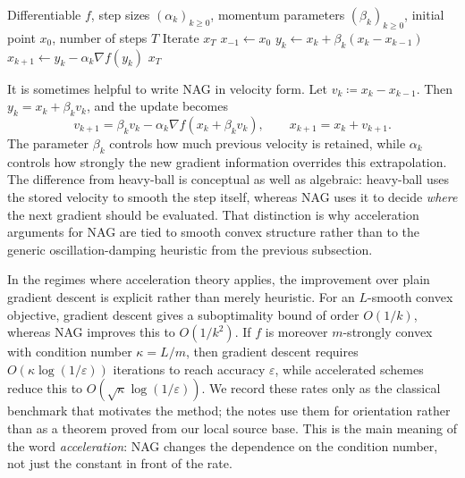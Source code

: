 \begin{algorithm}
  \caption{Nesterov accelerated gradient (NAG)}
  \label{alg:nag}
  \begin{algorithmic}[1]
    \Require Differentiable $f$, step sizes $(\alpha_k)_{k\ge 0}$, momentum parameters $(\beta_k)_{k\ge 0}$, initial point $x_0$, number of steps $T$
    \Ensure Iterate $x_T$
    \State $x_{-1} \gets x_0$
      \State $y_k \gets x_k + \beta_k(x_k-x_{k-1})$ 
      \State $x_{k+1} \gets y_k - \alpha_k \nabla f(y_k)$
    \EndFor
    \State \Return $x_T$
  \end{algorithmic}
\end{algorithm}

It is sometimes helpful to write NAG in velocity form.
Let $v_k \coloneqq x_k-x_{k-1}$.
Then $y_k = x_k + \beta_k v_k$, and the update becomes
\begin{equation}
  v_{k+1} = \beta_k v_k - \alpha_k \nabla f(x_k+\beta_k v_k),
  \qquad
  x_{k+1} = x_k + v_{k+1}.
  \label{eq:nag-velocity}
\end{equation}
The parameter $\beta_k$ controls how much previous velocity is retained, while $\alpha_k$ controls how strongly the new gradient information overrides this extrapolation.
The difference from heavy-ball is conceptual as well as algebraic:
heavy-ball uses the stored velocity to smooth the step itself, whereas NAG uses it to decide \emph{where} the next gradient should be evaluated.
That distinction is why acceleration arguments for NAG are tied to smooth convex structure rather than to the generic oscillation-damping heuristic from the previous subsection.

In the regimes where acceleration theory applies, the improvement over plain gradient descent is explicit rather than merely heuristic.
For an $L$-smooth convex objective, gradient descent gives a suboptimality bound of order $O(1/k)$, whereas NAG improves this to $O(1/k^2)$.
If $f$ is moreover $m$-strongly convex with condition number $\kappa=L/m$, then gradient descent requires $O(\kappa\log(1/\varepsilon))$ iterations to reach accuracy $\varepsilon$, while accelerated schemes reduce this to $O(\sqrt{\kappa}\log(1/\varepsilon))$.
We record these rates only as the classical benchmark that motivates the method; the notes use them for orientation rather than as a theorem proved from our local source base.
This is the main meaning of the word \emph{acceleration}: NAG changes the dependence on the condition number, not just the constant in front of the rate.

